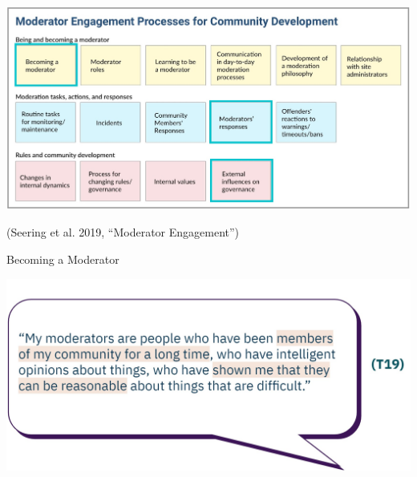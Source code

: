 \documentclass[nobackground,dvipsnames,table]{beamer}
\begin{document}
\begin{frame}{}

\vspace*{4.5ex}

\includegraphics[width=\textwidth]{img/fig18.jpg}

\vspace{12ex}
\scriptsize{\color{lightgray}(Seering et al. 2019, “Moderator Engagement”)}

\end{frame}



\begin{frame}{Becoming a Moderator}

\includegraphics[width=\textwidth]{img/fig19.jpg}

\end{frame}
\end{document}

